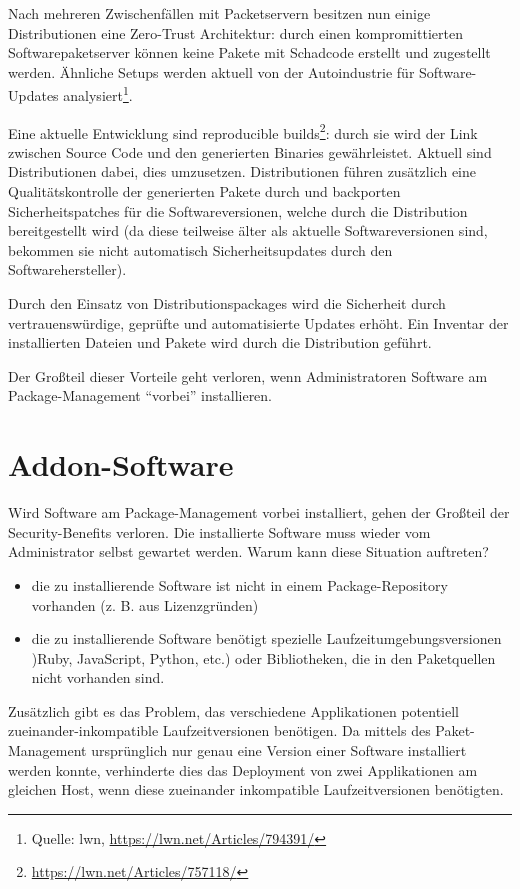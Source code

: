 Nach mehreren Zwischenfällen mit Packetservern besitzen nun einige Distributionen eine Zero-Trust Architektur: durch einen kompromittierten Softwarepaketserver können keine Pakete mit Schadcode erstellt und zugestellt werden. Ähnliche Setups werden aktuell von der Autoindustrie für Software-Updates analysiert\footnote{Quelle: lwn, \url{https://lwn.net/Articles/794391/}}.

Eine aktuelle Entwicklung sind reproducible builds\footnote{\url{https://lwn.net/Articles/757118/}}: durch sie wird der Link zwischen Source Code und den generierten Binaries gewährleistet. Aktuell sind Distributionen dabei, dies umzusetzen. Distributionen führen zusätzlich eine Qualitätskontrolle der generierten Pakete durch und backporten Sicherheitspatches für die Softwareversionen, welche durch die Distribution bereitgestellt wird (da diese teilweise älter als aktuelle Softwareversionen sind, bekommen sie nicht automatisch Sicherheitsupdates durch den Softwarehersteller).

Durch den Einsatz von Distributionspackages wird die Sicherheit durch vertrauenswürdige, geprüfte und automatisierte Updates erhöht. Ein Inventar der installierten Dateien und Pakete wird durch die Distribution geführt.

Der Großteil dieser Vorteile geht verloren, wenn Administratoren Software am Package-Management ``vorbei'' installieren.

\section{Addon-Software}

Wird Software am Package-Management vorbei installiert, gehen der Großteil der Security-Benefits verloren. Die installierte Software muss wieder vom Administrator selbst gewartet werden. Warum kann diese Situation auftreten?

\begin{itemize}
	\item die zu installierende Software ist nicht in einem Package-Repository vorhanden (z. B. aus Lizenzgründen)
	\item die zu installierende Software benötigt spezielle Laufzeitumgebungsversionen )Ruby, JavaScript, Python, etc.) oder Bibliotheken, die in den Paketquellen nicht vorhanden sind.
\end{itemize}

Zusätzlich gibt es das Problem, das verschiedene Applikationen potentiell zueinander-inkompatible Laufzeitversionen benötigen. Da mittels des Paket-Management ursprünglich nur genau eine Version einer Software installiert werden konnte, verhinderte dies das Deployment von zwei Applikationen am gleichen Host, wenn diese zueinander inkompatible Laufzeitversionen benötigten.


